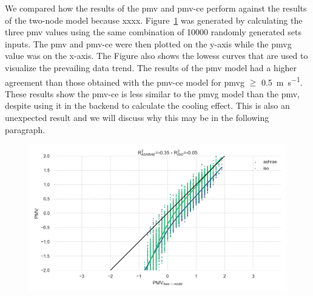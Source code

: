 We compared how the results of the \ac{pmv} and \ac{pmv-ce} perform against the results of the two-node model because xxxx. %
Figure~\ref{fig:pmv_two_node_comparison} was generated by calculating the three \ac{pmv} values using the same combination of \num{10000} randomly generated sets inputs.
The \ac{pmv} and \ac{pmv-ce} were then plotted on the y-axis while the \ac{pmvg} value was on the x-axis.
The Figure also shows the \ac{lowess} curves that are used to visualize the prevailing data trend.
The results of the \ac{pmv} model had a higher agreement than those obtained with the \ac{pmv-ce} model for \ac{pmvg} $\geq$ \qty{0.5}{\m\per\s}. %
These results show the \ac{pmv-ce} is less similar to the \ac{pmvg} model than the \ac{pmv}, despite using it in the backend to calculate the cooling effect.
This is also an unexpected result and we will discuss why this may be in the following paragraph. 

\begin{figure}[htb!]
    \centering
    \includegraphics[width=\textwidth]{figures/pmv_two_node_comparison}
    \caption{}
    \label{fig:pmv_two_node_comparison}
\end{figure}

